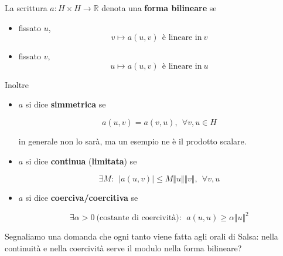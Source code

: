 \documentclass[10pt,a4paper,twoside,openright]{book}
\begin{document}
\begin{definition}
	La scrittura $a:H\times H\rightarrow \mathbb{R}$ denota una \textbf{forma bilineare} se
	\begin{itemize}
		\item fissato $u$,
		\begin{equation*}
		      v\mapsto a(u,v) \ \ \text{è lineare in} \ v
		\end{equation*}
		\item fissato $v$,
		\begin{equation*}
		      u\mapsto a(u,v) \ \ \text{è lineare in} \ u
		\end{equation*}
	\end{itemize}
\end{definition}
\begin{definition}
	Inoltre
	\begin{itemize}
		\item $a$ si dice \textbf{simmetrica} se
		      
		      \begin{equation*}
		      	a(u,v) =a(v,u),\ \ \forall v,u\in H
		      \end{equation*}
		      
		      in generale non lo sarà, ma un esempio ne è il prodotto scalare.
		\item $a$ si dice \textbf{continua} (\textbf{limitata}) se
		      
		      \begin{equation*}
		      	\exists M:\ \ | a(u,v)| \leqslant M\Vert u\Vert \Vert v\Vert,\ \ \forall v,u
		      \end{equation*}
		\item $a$ si dice \textbf{coerciva/coercitiva} se
		      
		      \begin{equation*}
		      	\exists \alpha  >0\ \text{(costante di coercività)} :\ \ a(u,u) \geqslant \alpha \Vert u\Vert ^{2}
		      \end{equation*}
	\end{itemize}
\end{definition}
Segnaliamo una domanda che ogni tanto viene fatta agli orali di Salsa: nella continuità e nella coercività serve il modulo nella forma bilineare?
\end{document}
